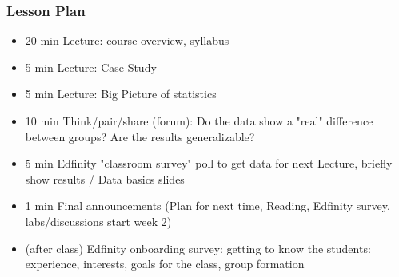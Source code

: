 \begin{frame}
    \frametitle{Lesson Plan}
    \begin{itemize}
        \item 20 min Lecture: course overview, syllabus
        \item 5 min Lecture: Case Study
        \item 5 min Lecture: Big Picture of statistics
        \item 10 min Think/pair/share (forum): Do the data show a "real" difference between groups? Are the results generalizable?
        \item 5 min Edfinity "classroom survey" poll to get data for next Lecture, briefly show results / Data basics slides
        \item 1 min Final announcements (Plan for next time, Reading, Edfinity survey, labs/discussions start week 2)
        \item (after class) Edfinity onboarding survey: getting to know the students: experience, interests, goals for the class, group formation
    \end{itemize}
\end{frame}
    


